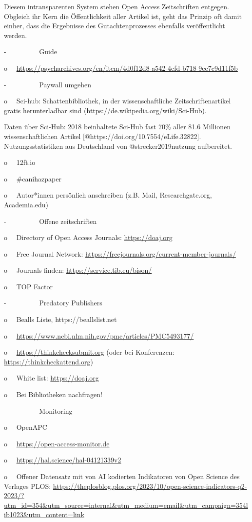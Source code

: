 \documentclass[
  letterpaper,
  DIV=11,
  numbers=noendperiod]{scrreprt}
\begin{document}
Diesem intransparenten System stehen Open Access Zeitschriften entgegen.
Obgleich ihr Kern die Öffentlichkeit aller Artikel ist, geht das Prinzip
oft damit einher, dass die Ergebnisse des Gutachtenprozesses ebenfalls
veröffentlicht werden.

-~~~~~~~~~ Guide

o~~
\url{https://psycharchives.org/en/item/4d0f12d8-a542-4cfd-b718-9ee7c9d11f5b}

-~~~~~~~~~ Paywall umgehen

o~~ Sci-hub: Schattenbibliothek, in der wissenschaftliche
Zeitschriftenartikel gratis herunterladbar sind
(https://de.wikipedia.org/wiki/Sci-Hub).

Daten über Sci-Hub: 2018 beinhaltete Sci-Hub fast 70\% aller 81.6
Millionen wissenschaftlichen Artikel
{[}@https://doi.org/10.7554/eLife.32822{]}. Nutzungsstatistiken aus
Deutschland von @strecker2019nutzung aufbereitet.

o~~ 12ft.io

o~~ \#canihazpaper

o~~ Autor*innen persönlich anschreiben (z.B. Mail, Researchgate.org,
Academia.edu)

-~~~~~~~~~ Offene zeitschriften

o~~ Directory of Open Access Journals: \url{https://doaj.org}

o~~ Free Journal Network:
\url{https://freejournals.org/current-member-journals/}

o~~ Journals finden: \url{https://service.tib.eu/bison/}~

o~~ TOP Factor

-~~~~~~~~~ Predatory Publishers

o~~ Bealls Liste, https://beallslist.net

o~~ \url{https://www.ncbi.nlm.nih.gov/pmc/articles/PMC5493177/}

o~~ \url{https://thinkchecksubmit.org} (oder bei Konferenzen:
\url{https://thinkcheckattend.org})

o~~ White list: \url{https://doaj.org}

o~~ Bei Bibliotheken nachfragen!

-~~~~~~~~~ Monitoring

o~~ OpenAPC

o~~ \url{https://open-access-monitor.de}

o~~ \url{https://hal.science/hal-04121339v2}

o~~ Offener Datensatz mit von AI kodierten Indikatoren von Open Science
des Verlages PLOS:
\url{https://theplosblog.plos.org/2023/10/open-science-indicators-q2-2023/?utm_id=354&utm_source=internal&utm_medium=email&utm_campaign=354lib1023&utm_content=link}
\end{document}
